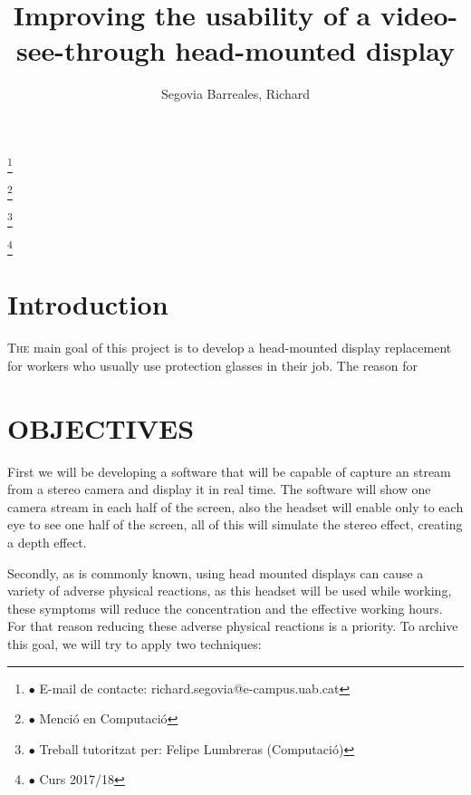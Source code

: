 \documentclass[10pt,a4paper,twocolumn,twoside]{article}
\author{\LARGE\sffamily Segovia Barreales, Richard}
\title{\Huge{\sffamily Improving the usability of a video-see-through head-mounted display}}
\date{}
\newcommand\blfootnote[1]{%
  \begingroup
  \renewcommand\thefootnote{}\footnote{#1}%
  \addtocounter{footnote}{-1}%
  \endgroup
}
\begin{document}
\fancyhead[RO]{\thepage}
\fancyhead[LE]{\thepage}

\fancyfoot[CO,CE]{}

{
   \fancyhf{}
}

\renewcommand{\headrulewidth}{0pt}
\renewcommand{\footrulewidth}{0pt}
\pagestyle{fancy}

\maketitle

\thispagestyle{primerapagina}


\blfootnote{$\bullet$ E-mail de contacte: richard.segovia@e-campus.uab.cat}
\blfootnote{$\bullet$ Menció en Computació}
\blfootnote{$\bullet$ Treball tutoritzat per: Felipe Lumbreras (Computació)}
\blfootnote{$\bullet$ Curs 2017/18}

\section{Introduction}

\lettrine[lines=3]{T}{he} main goal of this project is to develop a head-mounted display replacement for workers who usually use protection glasses in their job. The reason for 

\bigskip

\section{OBJECTIVES}


First we will be developing a software that will be capable of capture an stream from a stereo camera and display it in real time. The software will show one camera stream in each half of the screen, also the headset will enable only to each eye to see one half of the screen, all of this will simulate the stereo effect, creating a depth effect.

Secondly, as is commonly known, using head mounted displays can cause a variety of adverse physical reactions, as this headset will be used while working, these symptoms will reduce the concentration and the effective working hours. For that reason reducing these adverse physical reactions is a priority. To archive this goal, we will try to apply two techniques: 
\end{document}
